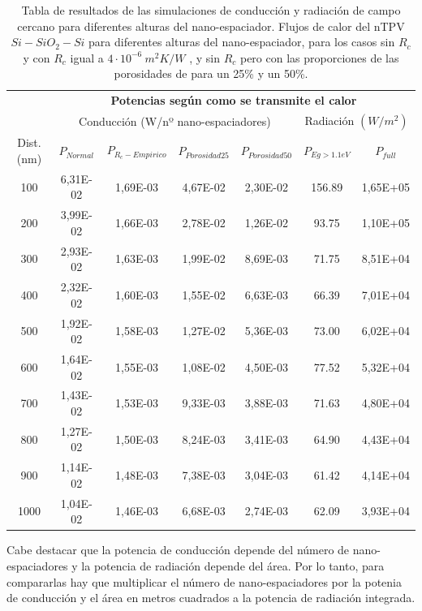 \begin{table}[H]
	\centering
		\caption[Tabla de resultados de las simulaciones de conducción y radiación de campo cercano para diferentes alturas del nano-espaciador. Flujos de calor del nTPV $Si-SiO_2-Si$ para diferentes alturas del nano-espaciador, para los casos sin $R_c$ y con $R_c$ igual a $4 \cdot 10^{-6} \ m^2 K/W$, y sin $R_c$ pero con las proporciones de las porosidades de unos 25\% y un 50\%.]{Tabla de resultados de las simulaciones de conducción y radiación de campo cercano para diferentes alturas del nano-espaciador. Flujos de calor del nTPV $Si-SiO_2-Si$ para diferentes alturas del nano-espaciador, para los casos sin $R_c$ y con $R_c$ igual a $4 \cdot 10^{-6} \ m^2 K/W$ \cite{nf_TPV_Pillars_SiO2}, y sin $R_c$ pero con las proporciones de las porosidades de \cite{ThermalConductivity_SiO2_2018} para un 25\% y un 50\%.}	
		\begin{tabular}{|c||c|c|c|c||c|c|}
		\hline
			\multirow{2}{*}{ }& \multicolumn{6}{c|}{\textbf{\large Potencias según como se transmite el calor}}\\ \cline{2-7}
		  & \multicolumn{4}{c||}{Conducción (W/nº nano-espaciadores)}& \multicolumn{2}{c|}{Radiación $(W/m^2)$}\\ \hline
			Dist. (nm)&$P_{Normal}$&$P_{R_c-Empirico}$&$P_{Porosidad25}$&$P_{Porosidad50}$&$P_{Eg>1.1eV}$&$P_{full}$\\ \hline \hline
			100&6,31E-02&1,69E-03&4,67E-02&2,30E-02&156.89&1,65E+05\\ \hline
			200&3,99E-02&1,66E-03&2,78E-02&1,26E-02&93.75&1,10E+05\\ \hline
			300&2,93E-02&1,63E-03&1,99E-02&8,69E-03&71.75&8,51E+04\\ \hline
			400&2,32E-02&1,60E-03&1,55E-02&6,63E-03&66.39&7,01E+04\\ \hline
			500&1,92E-02&1,58E-03&1,27E-02&5,36E-03&73.00&6,02E+04\\ \hline
			600&1,64E-02&1,55E-03&1,08E-02&4,50E-03&77.52&5,32E+04\\ \hline
			700&1,43E-02&1,53E-03&9,33E-03&3,88E-03&71.63&4,80E+04\\ \hline
			800&1,27E-02&1,50E-03&8,24E-03&3,41E-03&64.90&4,43E+04\\ \hline
			900&1,14E-02&1,48E-03&7,38E-03&3,04E-03&61.42&4,14E+04\\ \hline
		 1000&1,04E-02&1,46E-03&6,68E-03&2,74E-03&62.09&3,93E+04\\ \hline
		\end{tabular}
	\label{tab:condTerSiSiO2Si}
\end{table}
Cabe destacar que la potencia de conducción depende del número de nano-espaciadores y la potencia de radiación depende del área. Por lo tanto, para compararlas hay que multiplicar el número de nano-espaciadores por la potenia de conducción y el área en metros cuadrados a la potencia de radiación integrada.
\vfill \newpage
